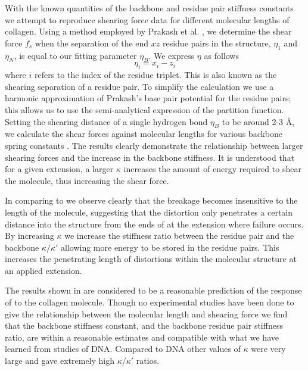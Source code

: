 With the known quantities of the backbone and residue pair stiffness constants we attempt to reproduce shearing force data for different molecular lengths of collagen. Using a method employed by Prakash et al. \cite{Prakash2011}, we determine the shear force $f_{s}$ when the separation of the end $xz$ residue pairs in the structure, $\eta_1$ and $\eta_N$, is equal to our fitting parameter $\eta_{B}$. We express $\eta$ as follows
%
\begin{equation}
\eta_{i}=x_{i}-z_{i}
\end{equation}
%
where $i$ refers to the index of the residue triplet. This is also known as the shearing separation of a residue pair. To simplify the calculation we use a harmonic approximation of Prakash's base pair potential for the residue pairs; this allows us to use the semi-analytical expression of the partition function. Setting the shearing distance of a single hydrogen bond $\eta_{B}$ to be around 2-3 \AA, we calculate the shear forces against molecular lengths for various backbone spring constants . The results clearly demonstrate the relationship between larger shearing forces and the increase in the backbone stiffness. It is understood that for a given extension, a larger $\kappa$ increases the amount of energy required to shear the molecule, thus increasing the shear force.

In comparing  to  we observe clearly that the breakage becomes insensitive to the length of the molecule, suggesting that the distortion only penetrates a certain distance into the structure from the ends of at the extension where failure occurs. By increasing $\kappa$ we increase the stiffness ratio between the residue pair and the backbone $\kappa/\kappa'$ allowing more energy to be stored in the residue pairs. This increases the penetrating length of distortions within the molecular structure at an applied extension.

The results shown in  are considered to be a reasonable prediction of the response of to the collagen molecule. Though no experimental studies have been done to give the relationship between the molecular length and shearing force we  find that the backbone stiffness constant, and the backbone residue pair stiffness ratio, are within a reasonable estimates and compatible with what we have learned from studies of DNA. Compared to DNA other values of $\kappa$ were very large and gave extremely high $\kappa/\kappa'$ ratios.

